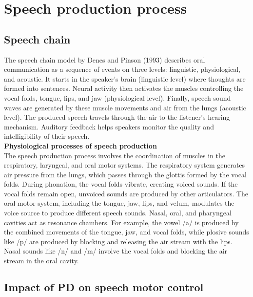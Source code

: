 \section{Speech production process}
\subsection{ Speech chain}
The speech chain model by Denes and Pinson (1993) describes oral communication as a sequence of events on three levels: linguistic, physiological, and acoustic. It starts in the speaker’s brain (linguistic level) where thoughts are formed into sentences.
Neural activity then activates the muscles controlling the vocal folds, tongue, lips, and jaw (physiological level).
Finally, speech sound waves are generated by these muscle movements and air from the lungs (acoustic level).
The produced speech travels through the air to the listener’s hearing mechanism.
Auditory feedback helps speakers monitor the quality and intelligibility of their speech.\\
\textbf{Physiological processes of speech production}\\
The speech production process involves the coordination of muscles in the respiratory, laryngeal, and oral motor systems. The respiratory system generates air pressure from the lungs, which passes through the glottis formed by the vocal folds. During phonation, the vocal folds vibrate, creating voiced sounds. If the vocal folds remain open, unvoiced sounds are produced by other articulators. The oral motor system, including the tongue, jaw, lips, and velum, modulates the voice source to produce different speech sounds. Nasal, oral, and pharyngeal cavities act as resonance chambers. For example, the vowel /a/ is produced by the combined movements of the tongue, jaw, and vocal folds, while plosive sounds like /p/ are produced by blocking and releasing the air stream with the lips. Nasal sounds like /n/ and /m/ involve the vocal folds and blocking the air stream in the oral cavity.

\subsection{ Impact of PD on speech motor control}

